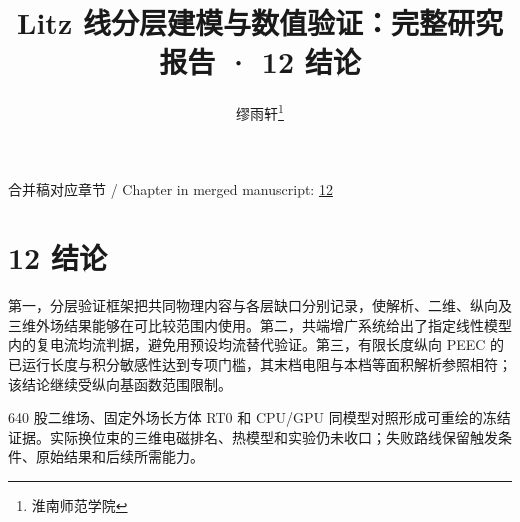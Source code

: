 \documentclass[journal,10pt]{IEEEtran}
\begin{document}
\title{Litz 线分层建模与数值验证：完整研究报告 · 12 结论}
\author{缪雨轩\thanks{淮南师范学院}}

\maketitle
\noindent 合并稿对应章节 / Chapter in merged manuscript: \href{report_zh-CN_ieee.pdf#chapter-12}{12}\par
\FloatBarrier
\section*{12 结论}
\hypertarget{chapter-12}{}
第一，分层验证框架把共同物理内容与各层缺口分别记录，使解析、二维、纵向及三维外场结果能够在可比较范围内使用。第二，共端增广系统给出了指定线性模型内的复电流均流判据，避免用预设均流替代验证。第三，有限长度纵向 PEEC 的已运行长度与积分敏感性达到专项门槛，其末档电阻与本档等面积解析参照相符；该结论继续受纵向基函数范围限制。


640 股二维场、固定外场长方体 RT0 和 CPU/GPU 同模型对照形成可重绘的冻结证据。实际换位束的三维电磁排名、热模型和实验仍未收口；失败路线保留触发条件、原始结果和后续所需能力。
\end{document}
